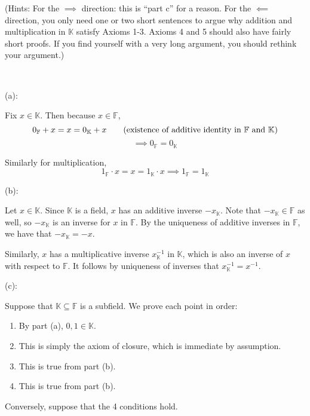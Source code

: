 \documentclass{article}
\theoremstyle{plain} %
\numberwithin{thm}{section} %
\theoremstyle{definition}
\begin{document}
\begin{question}{4}
\begin{enumerate}
            (Hints: For the \( \implies \) direction: this is ``part c'' for a reason. For the \( \impliedby \) direction, you only need one or two short sentences to argue why addition and multiplication in \( \mathbb{K} \) satisfy Axioms 1-3. Axioms 4 and 5 should also have fairly short proofs. If you find yourself with a very long argument, you should rethink your argument.)
            
        \end{enumerate}
        \tcblower
        \ 

        (a):

        Fix \(x \in \mathbb{K}\). Then because \(x \in \mathbb{F}\),
        \[
            0_{\mathbb{F}} + x = x = 0_{\mathbb{K}} + x \tag{existence of additive identity in \( \mathbb{F}\) and \(\mathbb{K}\)}
        \]
        \[
            \implies 0_{\mathbb{F}} = 0_{\mathbb{K}} \tag{by cancellation}
        \]

        Similarly for multiplication,
        \[
            1_{\mathbb{F}} \cdot x = x = 1_{\mathbb{K}} \cdot x \implies 1_{\mathbb{F}} = 1_{\mathbb{K}}
        \]

        \medskip

        (b):

        Let \(x \in \mathbb{K}\). Since \(\mathbb{K}\) is a field, \(x\) has an additive inverse \(-x_{\mathbb{K}}\). Note that \(-x_{\mathbb{K}} \in \mathbb{F}\) as well, so \(-x_{\mathbb{K}}\) is an inverse for \(x\) in \(\mathbb{F}\). By the uniqueness of additive inverses in \(\mathbb{F}\), we have that \(-x_{\mathbb{K}} = -x\).

        Similarly, \(x\) has a multiplicative inverse \(x^{-1}_{\mathbb{K}}\) in \(\mathbb{K}\), which is also an inverse of \(x\) with respect to \(\mathbb{F}\). It follows by uniqueness of inverses that \(x ^{-1}_{\mathbb{K}} = x^{-1}\).

        \medskip

        (c):

        Suppose that \(\mathbb{K} \subseteq \mathbb{F}\) is a subfield. We prove each point in order:
        \begin{enumerate}[label=(\roman*)]
            \item By part (a), \(0,1 \in \mathbb{K}\).
            \item This is simply the axiom of closure, which is immediate by assumption.
            \item This is true from part (b).
            \item This is true from part (b).
        \end{enumerate}
        Conversely, suppose that the 4 conditions hold.


\end{question}
\end{document}
